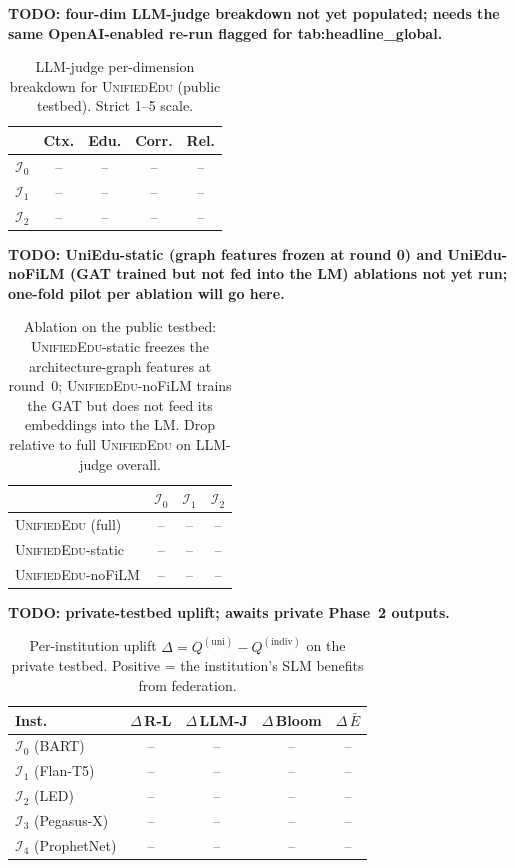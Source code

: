 \documentclass[11pt]{article}
\theoremstyle{plain}
\theoremstyle{definition}
\theoremstyle{remark}
\newcommand{\red}[1]{\textcolor{myred}{\textbf{#1}}}
\newcommand{\UniEdu}{\textsc{UnifiedEdu}}
\newcommand{\indiv}{\text{indiv}}
\newcommand{\uni}{\text{uni}}
\begin{document}
\red{TODO: four-dim LLM-judge breakdown not yet populated; needs the same OpenAI-enabled re-run flagged for tab:headline\_global.}
\begin{table}[t]
\centering
\footnotesize
\caption{LLM-judge per-dimension breakdown for
\UniEdu{} (public testbed). Strict 1--5 scale.}
\label{tab:public_llm_judge_dims}
\setlength{\tabcolsep}{4pt}
\begin{tabular}{lcccc}
\toprule
& \textbf{Ctx.} & \textbf{Edu.} & \textbf{Corr.} &
\textbf{Rel.} \\
\midrule
$\mathcal{I}_0$ & -- & -- & -- & -- \\
$\mathcal{I}_1$ & -- & -- & -- & -- \\
$\mathcal{I}_2$ & -- & -- & -- & -- \\
\bottomrule
\end{tabular}
\end{table}

\red{TODO: UniEdu-static (graph features frozen at round 0) and UniEdu-noFiLM (GAT trained but not fed into the LM) ablations not yet run; one-fold pilot per ablation will go here.}
\begin{table}[t]
\centering
\small
\caption{Ablation on the public testbed:
\UniEdu{}-static freezes the architecture-graph
features at round~0; \UniEdu{}-noFiLM trains the GAT
but does not feed its embeddings into the LM. Drop
relative to full \UniEdu{} on LLM-judge overall.}
\label{tab:public_ablation}
\begin{tabular}{lccc}
\toprule
& $\mathcal{I}_0$ & $\mathcal{I}_1$ & $\mathcal{I}_2$ \\
\midrule
\UniEdu{} (full)    & -- & -- & -- \\
\UniEdu{}-static    & -- & -- & -- \\
\UniEdu{}-noFiLM    & -- & -- & -- \\
\bottomrule
\end{tabular}
\end{table}

\red{TODO: private-testbed uplift; awaits private Phase~2 outputs.}
\begin{table}[t]
\centering
\footnotesize
\setlength{\tabcolsep}{4pt}
\caption{Per-institution uplift $\Delta = Q^{(\uni)}
- Q^{(\indiv)}$ on the private testbed. Positive =
the institution's SLM benefits from federation.}
\label{tab:uplift}
\begin{tabular}{lcccc}
\toprule
\textbf{Inst.} & $\Delta\,$\textbf{R-L} &
$\Delta\,$\textbf{LLM-J} & $\Delta\,$\textbf{Bloom} &
$\Delta\,\bar{E}$ \\
\midrule
$\mathcal{I}_0$ (BART)        & -- & -- & -- & -- \\
$\mathcal{I}_1$ (Flan-T5)     & -- & -- & -- & -- \\
$\mathcal{I}_2$ (LED)         & -- & -- & -- & -- \\
$\mathcal{I}_3$ (Pegasus-X)   & -- & -- & -- & -- \\
$\mathcal{I}_4$ (ProphetNet)  & -- & -- & -- & -- \\
\bottomrule
\end{tabular}
\end{table}
\end{document}
